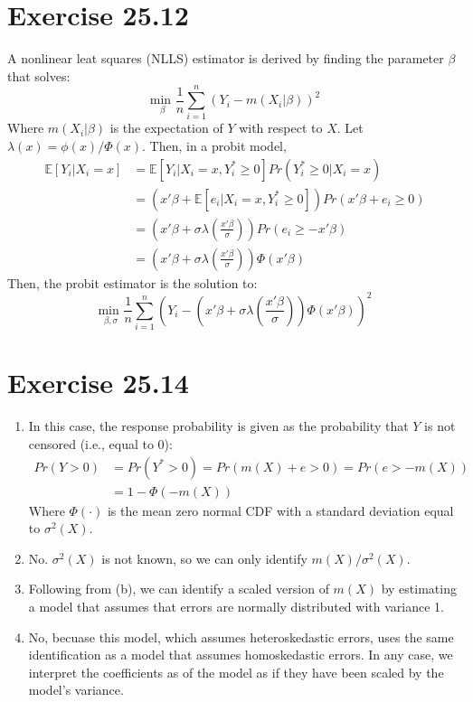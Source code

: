 \documentclass{article}
\newcommand{\usmin}[1]{\underset{#1}{\text{min }}}
\newcommand{\sumn}{\sum_{i=1}^{n}}
\newcommand{\E}[1]{\mathbb{E}\left[#1\right]}%
\begin{document}
\section*{Exercise 25.12}
A nonlinear leat squares (NLLS) estimator is derived by finding the parameter $\beta$ that solves:
\[
	\usmin{\beta}\frac{1}{n}\sumn \left(Y_i-m(X_i|\beta)\right)^2
\]
Where ${m(X_i|\beta)}$ is the expectation of $Y$ with respect to $X$. Let ${\lambda(x)=\phi(x)/\Phi(x)}$. Then, in a probit model,
\begin{align*}
	\E{Y_i|X_i=x}	&= \E{Y_i|X_i=x,Y_i^*\geq 0}Pr\left(Y_i^*\geq 0|X_i=x\right)												\\
					&= \left(x'\beta + \E{e_i|X_i=x,Y_i^*\geq 0}\right)Pr\left(x'\beta+e_i\geq0\right)							\\
					&= \left(x'\beta + \sigma\lambda\left(\frac{x'\beta}{\sigma}\right)\right)Pr\left(e_i\geq-x'\beta\right)	\\
					&= \left(x'\beta + \sigma\lambda\left(\frac{x'\beta}{\sigma}\right)\right)\Phi\left(x'\beta\right)
\end{align*}
Then, the probit estimator is the solution to:
\[
	\usmin{\beta,\sigma}\frac{1}{n}\sumn \left(Y_i-\left(x'\beta + \sigma\lambda\left(\frac{x'\beta}{\sigma}\right)\right)\Phi\left(x'\beta\right)\right)^2
\]


\section*{Exercise 25.14}

\begin{enumerate}
	\item In this case, the response probability is given as the probability that $Y$ is not censored (i.e., equal to 0):
		\begin{align*}
			Pr(Y>0)	&= Pr(Y^*>0) = Pr(m(X) + e>0) = Pr(e>-m(X))	\\
					&= 1 - \Phi\left(-m(X)\right)
		\end{align*}
		Where $\Phi(\cdot)$ is the mean zero normal CDF with a standard deviation equal to $\sigma^2(X)$.
	
	\item No. $\sigma^2(X)$ is not known, so we can only identify $m(X)/\sigma^2(X)$.
	
	\item Following from (b), we can identify a scaled version of $m(X)$ by estimating a model that assumes that errors are normally distributed with variance 1.
	
	\item No, becuase this model, which assumes heteroskedastic errors, uses the same identification as a model that assumes homoskedastic errors. In any case, we interpret the coefficients as of the model as if they have been scaled by the model's variance.
	
\end{enumerate}
\end{document}
